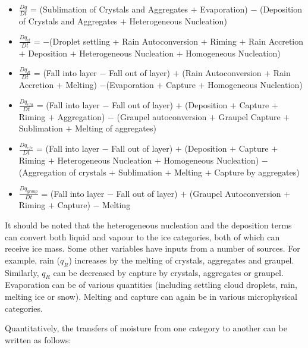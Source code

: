 \documentclass{UMDP_article}
\begin{document}
\begin{itemize}
\item{$\frac{Dq}{Dt}$ = 
(Sublimation of Crystals and Aggregates $+$ Evaporation) $-$ 
(Deposition of Crystals and Aggregates $+$ Heterogeneous Nucleation)}
\item{$\frac{Dq_{cl}}{Dt}$ = 
$-$(Droplet settling + Rain Autoconversion $+$ Riming $+$ Rain Accretion $+$ 
Deposition $+$
Heterogeneous Nucleation $+$ Homogeneous Nucleation)}
\item{$\frac{Dq_R}{Dt}$ = 
(Fall into layer $-$ Fall out of layer) $+$ (Rain Autoconversion $+$ 
Rain Accretion $+$ Melting) $-$(Evaporation $+$ Capture $+$ Homogeneous Nucleation)}
\item{$\frac{Dq_{cfa}}{Dt}$ = 
(Fall into layer $-$ Fall out of layer) $+$
(Deposition $+$ Capture $+$ Riming $+$ Aggregation) $-$ 
(Graupel autoconversion $+$ Graupel Capture $+$ Sublimation $+$ 
Melting of aggregates)}
\item{$\frac{Dq_{cfc}}{Dt}$ = 
(Fall into layer $-$ Fall out of layer) $+$
(Deposition $+$ Capture $+$ Riming $+$ Heterogeneous Nucleation 
$+$ Homogeneous Nucleation) $-$ (Aggregation of crystals $+$ Sublimation 
$+$ Melting $+$ Capture by aggregates)}
\item{$\frac{Dq_{graup}}{Dt}$ =  
(Fall into layer $-$ Fall out of layer) $+$ 
(Graupel Autoconversion $+$ Riming $+$ Capture) $-$
Melting}

\end{itemize}

It should be noted that the heterogeneous nucleation and the deposition terms 
can convert both liquid and vapour to the ice categories, both of which can 
receive ice mass. Some other variables have inputs from a number of sources. 
For example, rain ($q_R$) increases by the melting of crystals, aggregates and 
graupel. Similarly, $q_R$ can be decreased by capture by crystals, aggregates
or graupel. Evaporation can be of various quantities (including settling cloud
droplets, rain, melting ice or snow). Melting and capture can again be in
various microphysical categories.

\newpage
Quantitatively, the transfers of moisture from one category to another can be
written as follows:
\end{document}
